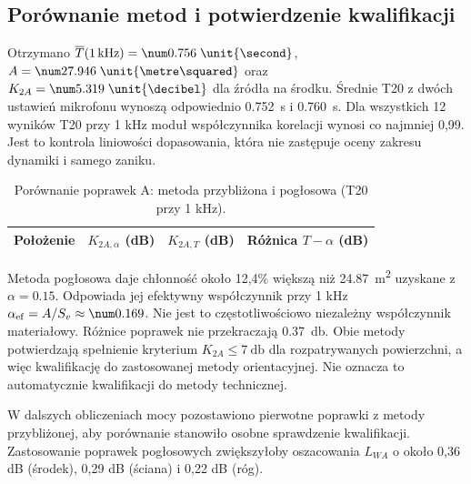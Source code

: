\subsection{Porównanie metod i potwierdzenie kwalifikacji}
Otrzymano
$\overline T(1\,\mathrm{kHz})=\reverbTime\;\unit{\second}$,
$A=\reverbAbsorption\;\unit{\metre\squared}$ oraz
$K_{2A}=\reverbCorrection\;\unit{\decibel}$ dla źródła na środku.
Średnie T20 z dwóch ustawień mikrofonu wynoszą odpowiednio
\qty{0.752}{\second} i \qty{0.760}{\second}.
Dla wszystkich 12 wyników T20 przy 1 kHz moduł współczynnika korelacji
wynosi co najmniej 0,99. Jest to kontrola liniowości dopasowania,
która nie zastępuje oceny zakresu dynamiki i samego zaniku.
\begin{table}[H]
\centering
\caption{Porównanie poprawek A: metoda przybliżona i pogłosowa (T20 przy 1 kHz).}
\begin{tabular}{@{}l r r r@{}}
\toprule
Położenie & $K_{2A,\alpha}$ (dB) & $K_{2A,T}$ (dB) & Różnica $T-\alpha$ (dB)\\
\midrule

\end{tabular}
\end{table}
Metoda pogłosowa daje chłonność około 12,4\% większą niż
\qty{24.87}{\metre\squared} uzyskane z $\alpha=\num{0.15}$.
Odpowiada jej efektywny współczynnik przy 1 kHz
$\alpha_{\mathrm{ef}}=A/S_v\approx\reverbAlpha$.
Nie jest to częstotliwościowo niezależny współczynnik materiałowy.
Różnice poprawek nie przekraczają \qty{0.37}{\decibel}.
Obie metody potwierdzają spełnienie kryterium
$K_{2A}\leq\qty{7}{\decibel}$ dla rozpatrywanych powierzchni,
a więc kwalifikację do zastosowanej metody orientacyjnej.
Nie oznacza to automatycznie kwalifikacji do metody technicznej.

W dalszych obliczeniach mocy pozostawiono pierwotne poprawki z metody
przybliżonej, aby porównanie stanowiło osobne sprawdzenie kwalifikacji.
Zastosowanie poprawek pogłosowych zwiększyłoby oszacowania $L_{WA}$
o około 0,36 dB (środek), 0,29 dB (ściana) i 0,22 dB (róg).
